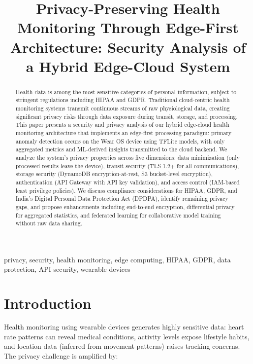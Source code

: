 \documentclass[conference]{IEEEtran}
\begin{document}
\title{Privacy-Preserving Health Monitoring Through Edge-First Architecture: Security Analysis of a Hybrid Edge-Cloud System}

\author{
}

\maketitle

\begin{abstract}
Health data is among the most sensitive categories of personal information, subject to stringent regulations including HIPAA and GDPR. Traditional cloud-centric health monitoring systems transmit continuous streams of raw physiological data, creating significant privacy risks through data exposure during transit, storage, and processing. This paper presents a security and privacy analysis of our hybrid edge-cloud health monitoring architecture that implements an edge-first processing paradigm: primary anomaly detection occurs on the Wear OS device using TFLite models, with only aggregated metrics and ML-derived insights transmitted to the cloud backend. We analyze the system's privacy properties across five dimensions: data minimization (only processed results leave the device), transit security (TLS 1.2+ for all communications), storage security (DynamoDB encryption-at-rest, S3 bucket-level encryption), authentication (API Gateway with API key validation), and access control (IAM-based least privilege policies). We discuss compliance considerations for HIPAA, GDPR, and India's Digital Personal Data Protection Act (DPDPA), identify remaining privacy gaps, and propose enhancements including end-to-end encryption, differential privacy for aggregated statistics, and federated learning for collaborative model training without raw data sharing.
\end{abstract}

\begin{IEEEkeywords}
privacy, security, health monitoring, edge computing, HIPAA, GDPR, data protection, API security, wearable devices
\end{IEEEkeywords}

\section{Introduction}
Health monitoring using wearable devices generates highly sensitive data: heart rate patterns can reveal medical conditions, activity levels expose lifestyle habits, and location data (inferred from movement patterns) raises tracking concerns. The privacy challenge is amplified by:
\end{document}
